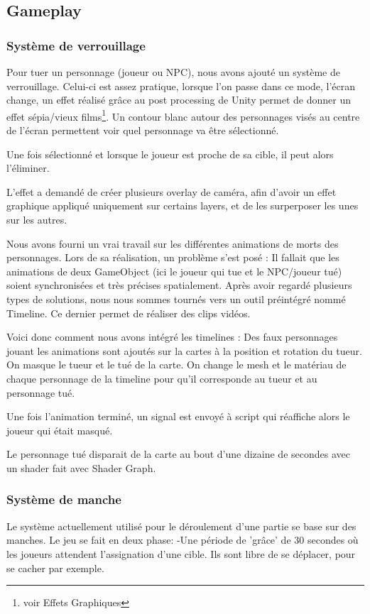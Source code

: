 \subsection{Gameplay}

\subsubsection{Système de verrouillage}

Pour tuer un personnage (joueur ou NPC),
nous avons ajouté un système de verrouillage. Celui-ci est assez pratique, lorsque l'on passe dans ce mode, l'écran change,
un effet réalisé grâce au post processing de Unity permet de donner un effet sépia/vieux films\footnote{voir Effets Graphiques}.
Un contour blanc autour des personnages visés au centre de l'écran permettent voir quel personnage va être sélectionné.

Une fois sélectionné et lorsque le joueur est proche de sa cible, il peut alors l'éliminer.

L'effet a demandé de créer plusieurs overlay de caméra, afin d'avoir un effet graphique
appliqué uniquement sur certains layers, et de les surperposer les unes sur les autres. 

Nous avons fourni un vrai travail sur les différentes animations de morts des personnages.
Lors de sa réalisation, un problème s'est posé : Il fallait que les animations de deux GameObject (ici le joueur qui tue et le NPC/joueur tué) 
soient synchronisées et très précises spatialement. Après avoir regardé plusieurs types de solutions, nous nous sommes tournés vers un outil préintégré nommé Timeline.
Ce dernier permet de réaliser des clips vidéos.

Voici donc comment nous avons intégré les timelines :
\newline
Des faux personnages jouant les animations sont ajoutés sur la cartes à la position et rotation du tueur.
On masque le tueur et le tué de la carte.
On change le mesh et le matériau de chaque personnage de la timeline pour qu'il corresponde au tueur et au
personnage tué.

Une fois l'animation terminé, un signal est envoyé à script qui réaffiche alors le joueur qui était masqué.

Le personnage tué disparait de la carte au bout d'une dizaine de secondes avec un shader fait avec Shader Graph.

\subsubsection{Système de manche}
    Le système actuellement utilisé pour le déroulement d'une partie se base sur des manches. Le jeu se fait en deux phase:
    	-Une période de 'grâce' de 30 secondes où les joueurs attendent l'assignation d'une cible. 
	 Ils sont libre de se déplacer, pour se cacher par exemple.

